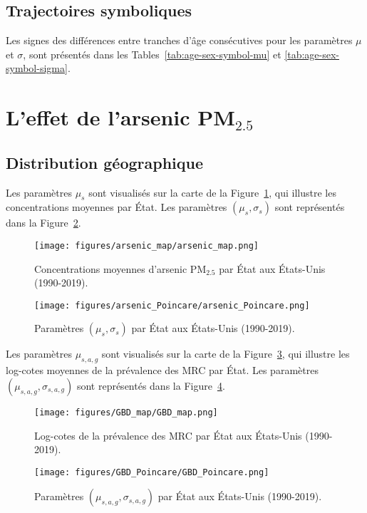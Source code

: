 \subsection{Trajectoires symboliques}
Les signes des différences entre tranches d'âge consécutives pour les paramètres $\mu$ et $\sigma$, sont présentés dans les Tables~\ref{tab:age-sex-symbol-mu} et \ref{tab:age-sex-symbol-sigma}.

\begin{table}[H]
	\centering
	
	\label{tab:age-sex-symbol-mu}
\end{table}

\begin{table}[H]
	\centering
	
	\label{tab:age-sex-symbol-sigma}
\end{table}


\section{L'effet de l'arsenic PM\(_{2.5}\)}

\subsection{Distribution géographique}
Les paramètres \(\mu_s\) sont visualisés sur la carte de la Figure~\ref{fig:arsenic-map}, qui illustre les concentrations moyennes par État. Les paramètres \((\mu_s, \sigma_s)\) sont représentés dans la Figure~\ref{fig:arsenic_Poincare}.
\begin{figure}[H]
	\centering
	\texttt{[image: figures/arsenic\_map/arsenic\_map.png]}
	\caption{Concentrations moyennes d'arsenic PM\(_{2.5}\) par État aux États-Unis (1990-2019).}
	\label{fig:arsenic-map}
\end{figure}
\begin{figure}[H]
	\centering
	\texttt{[image: figures/arsenic\_Poincare/arsenic\_Poincare.png]}
	\caption{Paramètres \((\mu_s, \sigma_s)\) par État aux États-Unis (1990-2019).}
	\label{fig:arsenic_Poincare}
\end{figure}
Les paramètres \(\mu_{s,a,g}\) sont visualisés sur la carte de la Figure~\ref{fig:GBD-map}, qui illustre les log-cotes moyennes de la prévalence des MRC par État. Les paramètres \((\mu_{s,a,g}, \sigma_{s,a,g})\) sont représentés dans la Figure~\ref{fig:GBD_Poincare}.
\begin{figure}[H]
	\centering
	\texttt{[image: figures/GBD\_map/GBD\_map.png]}
	\caption{Log-cotes de la prévalence des MRC par État aux États-Unis (1990-2019).}
	\label{fig:GBD-map}
\end{figure}
\begin{figure}[H]
	\centering
	\texttt{[image: figures/GBD\_Poincare/GBD\_Poincare.png]}
	\caption{Paramètres \((\mu_{s,a,g}, \sigma_{s,a,g})\) par État aux États-Unis (1990-2019).}
	\label{fig:GBD_Poincare}
\end{figure}

